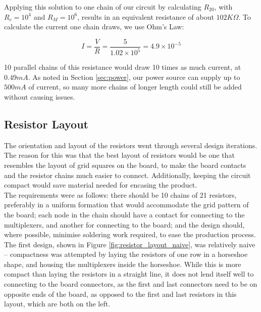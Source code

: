 Applying this solution to one chain of our circuit by calculating $R_{20}$, with $R_c = 10^4$ and $R_M = 10^6$, results in an equivalent resistance of about $102K\Omega$. To calculate the current one chain draws, we use Ohm's Law:

\begin{equation}
\label{eq:ohms_law}
I = \frac{V}{R} = \frac{5}{1.02 \times 10^{5}} = 4.9 \times 10^{-5} 
\end{equation}

10 parallel chains of this resistance would draw 10 times as much current, at $0.49mA$. As noted in Section \ref{sec:power}, our power source can supply up to $500mA$ of current, so many more chains of longer length could still be added without causing issues. 



\subsection {Resistor Layout}

The orientation and layout of the resistors went through several design iterations. The reason for this was that the best layout of resistors would be one that resembles the layout of grid squares on the board, to make the board contacts and the resistor chains much easier to connect. Additionally, keeping the circuit compact would save material needed for encasing  the product. \\

The requirements were as follows: there should be 10 chains of 21 resistors, preferably in a uniform formation that would accommodate the grid pattern of the board; each node in the chain should have a contact for connecting to the multiplexers, and another for connecting to the board; and the design should, where possible, minimise soldering work required, to ease the production process.\\

The first design, shown in Figure \ref{fig:resistor_layout_naive},  was relatively naive -- compactness was attempted by laying the resistors of one row in a horseshoe shape, and housing the multiplexers inside the horseshoe. While this is more compact than laying the resistors in a straight line, it does not lend itself well to connecting to the board connectors, as the first and last connectors need to be on opposite ends of the board, as opposed to the first and last resistors in this layout, which are both on the left.\\



